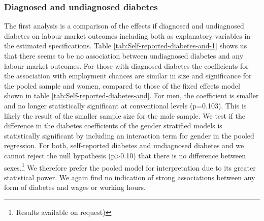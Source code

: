 \subsubsection*{Diagnosed and undiagnosed diabetes}

The first analysis is a comparison of the effects if diagnosed and
undiagnosed diabetes on labour market outcomes including both as explanatory
variables in the estimated specifications. Table \ref{tab:Self-reported-diabetes-and-1}
shows us that there seems to be no association between undiagnosed
diabetes and any labour market outcomes. For those with diagnosed
diabetes the coefficients for the association with employment chances
are similar in size and significance for the pooled sample and women,
compared to those of the fixed effects model shown in table \ref{tab:Self-reported-diabetes-and}.
For men, the coefficient is smaller and no longer statistically significant
at conventional levels (p=0.103). This is likely the result of the
smaller sample size for the male sample. We test if the difference
in the diabetes coefficients of the gender stratified models is statistically
significant by including an interaction term for gender in the pooled
regression. For both, self-reported diabetes and undiagnosed diabetes
and we cannot reject the null hypothesis (p>0.10) that there is no
difference between sexes.\footnote{Results available on request)}
We therefore prefer the pooled model for interpretation due to its
greater statistical power. We again find no indication of strong associations
between any form of diabetes and wages or working hours. 

